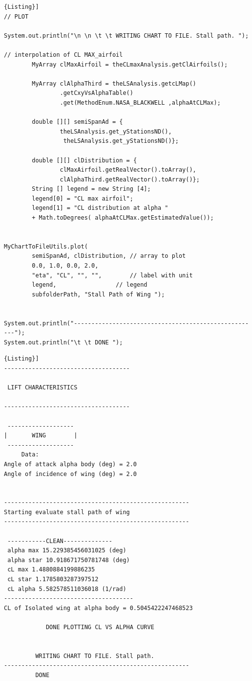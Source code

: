 \begin{lstlisting}[frame=rbl,caption={{\footnotesize Lift Characteristics of a Lifting Surface - Test Class}},label= [style=\bfseries]{Listing}]
// PLOT

System.out.println("\n \n \t \t WRITING CHART TO FILE. Stall path. ");

// interpolation of CL MAX_airfoil
		MyArray clMaxAirfoil = theCLmaxAnalysis.getClAirfoils();

		MyArray clAlphaThird = theLSAnalysis.getcLMap()
				.getCxyVsAlphaTable()
				.get(MethodEnum.NASA_BLACKWELL ,alphaAtCLMax);

		double [][] semiSpanAd = {
				theLSAnalysis.get_yStationsND(),
				 theLSAnalysis.get_yStationsND()};

		double [][] clDistribution = {
				clMaxAirfoil.getRealVector().toArray(), 
				clAlphaThird.getRealVector().toArray()};
		String [] legend = new String [4];
		legend[0] = "CL max airfoil";
		legend[1] = "CL distribution at alpha " 
		+ Math.toDegrees( alphaAtCLMax.getEstimatedValue());


MyChartToFileUtils.plot(
		semiSpanAd,	clDistribution, // array to plot
		0.0, 1.0, 0.0, 2.0,					
		"eta", "CL", "", "",	    // label with unit
		legend,					// legend
		subfolderPath, "Stall Path of Wing ");			


System.out.println("-----------------------------------------------------");
System.out.println("\t \t DONE ");

\end{lstlisting}


\begin{lstlisting}[caption={{\footnotesize Lift Characteristics of a Lifting Surface - Results for M=0.2. ATR-72}},label= [style=\bfseries]{Listing}]
------------------------------------

 LIFT CHARACTERISTICS  

------------------------------------

 ------------------- 
|       WING        |
 ------------------- 
 	 Data: 
Angle of attack alpha body (deg) = 2.0
Angle of incidence of wing (deg) = 2.0

 
-----------------------------------------------------
Starting evaluate stall path of wing
-----------------------------------------------------

 -----------CLEAN-------------- 
 alpha max 15.229385456031025 (deg)
 alpha star 10.918671750781748 (deg)
 cL max 1.4880884199886235
 cL star 1.1785803287397512
 cL alpha 5.582578511036018 (1/rad)
-------------------------------------
CL of Isolated wing at alpha body = 0.5045422247468523

 	 	 	DONE PLOTTING CL VS ALPHA CURVE  

 
 	 	 WRITING CHART TO FILE. Stall path. 
-----------------------------------------------------
	 	 DONE 
\end{lstlisting}


